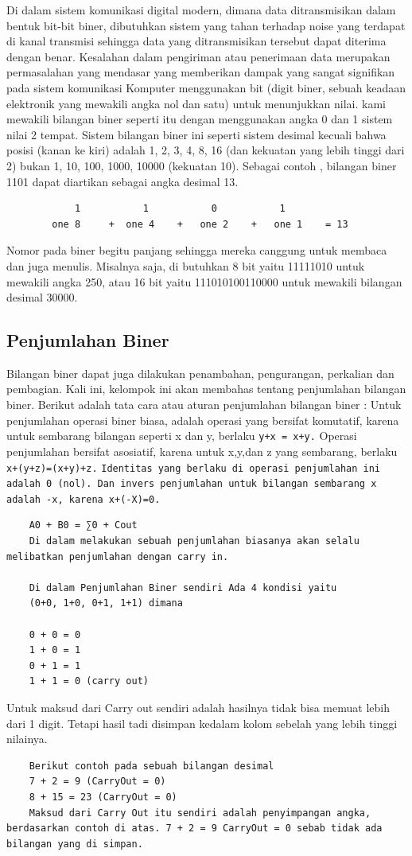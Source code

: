 	Di dalam sistem komunikasi digital modern, dimana data ditransmisikan dalam bentuk bit-bit biner, dibutuhkan sistem yang tahan terhadap noise yang terdapat di kanal transmisi sehingga data yang ditransmisikan tersebut dapat diterima dengan benar. Kesalahan dalam pengiriman atau penerimaan data merupakan permasalahan yang mendasar yang memberikan dampak yang sangat signifikan pada sistem komunikasi
	Komputer menggunakan bit (digit biner, sebuah keadaan elektronik yang mewakili angka nol dan satu) untuk menunjukkan nilai. kami mewakili bilangan biner seperti itu dengan menggunakan angka 0 dan 1 sistem nilai 2 tempat. Sistem bilangan biner ini seperti sistem desimal kecuali bahwa posisi (kanan ke kiri) adalah 1, 2, 3, 4, 8, 16 (dan kekuatan yang lebih tinggi dari 2) bukan 1, 10, 100, 1000, 10000 (kekuatan 10). Sebagai contoh , bilangan biner 1101 dapat diartikan sebagai angka desimal 13\cite{detmer2001introduction}.
		\begin{verbatim}
			1			1			0			1
		one 8	  +	 one 4	  +	  one 2    +   one 1 	= 13
		\end{verbatim}
	Nomor pada  biner begitu panjang sehingga mereka canggung  untuk membaca dan juga menulis. Misalnya saja, di butuhkan 8 bit yaitu  11111010 untuk mewakili angka 250, atau 16 bit yaitu 111010100110000 untuk mewakili bilangan desimal 30000.


\subsection {Penjumlahan Biner}
Bilangan biner dapat juga dilakukan penambahan, pengurangan, perkalian dan pembagian. Kali ini, kelompok ini akan membahas tentang penjumlahan bilangan biner. Berikut adalah tata cara atau aturan penjumlahan bilangan biner :
Untuk penjumlahan operasi biner biasa, adalah operasi yang bersifat komutatif, karena untuk sembarang bilangan seperti x dan y, berlaku \verb|y+x = x+y.| Operasi penjumlahan bersifat asosiatif\cite{brent1970addition}, karena untuk x,y,dan z yang sembarang, berlaku \verb|x+(y+z)=(x+y)+z.| \verb|Identitas yang berlaku di operasi penjumlahan ini adalah 0 (nol). Dan invers penjumlahan untuk bilangan sembarang x adalah -x, karena x+(-X)=0.|
\begin{verbatim}
	A0 + B0 = ∑0 + Cout
	Di dalam melakukan sebuah penjumlahan biasanya akan selalu melibatkan penjumlahan dengan carry in.

	Di dalam Penjumlahan Biner sendiri Ada 4 kondisi yaitu
	(0+0, 1+0, 0+1, 1+1) dimana

	0 + 0 = 0
	1 + 0 = 1
	0 + 1 = 1
	1 + 1 = 0 (carry out) 
\end{verbatim}
	Untuk maksud dari Carry out sendiri adalah hasilnya tidak bisa memuat lebih dari 1 digit. Tetapi  hasil tadi disimpan kedalam kolom sebelah yang lebih tinggi nilainya.
\begin{verbatim}
	Berikut contoh pada sebuah bilangan desimal
	7 + 2 = 9 (CarryOut = 0)
	8 + 15 = 23 (CarryOut = 0)
	Maksud dari Carry Out itu sendiri adalah penyimpangan angka, berdasarkan contoh di atas. 7 + 2 = 9 CarryOut = 0 sebab tidak ada bilangan yang di simpan. 
\end{verbatim}
		
